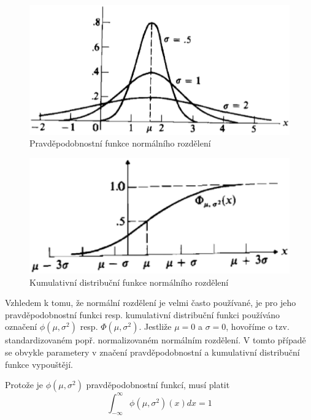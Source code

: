 \begin{figure}[htp]
\centering
\includegraphics[scale = 0.5]{pictures/normal_distribution.eps}
\caption{Pravděpodobnostní funkce normálního rozdělení}
\label{normal_distribution}
\end{figure}

\begin{figure}[htp]
\centering
\includegraphics[scale = 0.5]{pictures/normal_cumulative_distribution.eps}
\caption{Kumulativní distribuční funkce normálního rozdělení}
\label{normal_cumulative_distribution}
\end{figure}   

Vzhledem k tomu, že normální rozdělení je velmi často používané, je pro jeho pravděpodobnostní funkci resp. kumulativní distribuční funkci používáno označení $\phi(\mu, \sigma^2)$ resp. $\Phi(\mu, \sigma^2)$. Jestliže $\mu = 0$ a $\sigma = 0$, hovoříme o tzv. standardizovaném popř. normalizovaném normálním rozdělení. V tomto případě se obvykle parametery v značení pravděpodobnostní a kumulativní distribuční funkce vypouštějí.

Protože je $\phi(\mu, \sigma^2)$ pravděpodobnostní funkcí, musí platit
\begin{equation*}
\int_{-\infty}^{\infty} \phi(\mu, \sigma^2)(x) dx = 1
\end{equation*}

